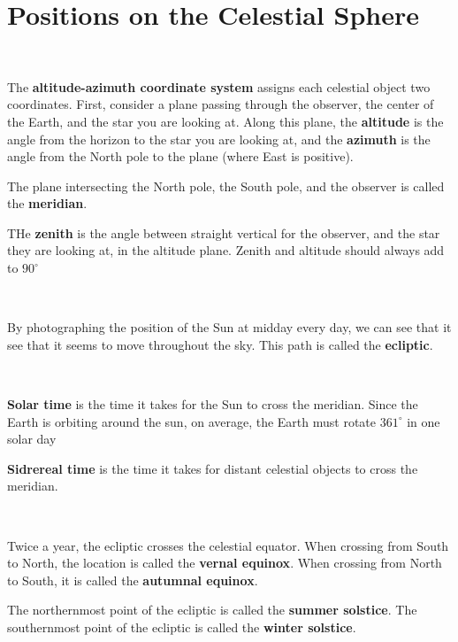 \documentclass{article}
\begin{document}
\section{Positions on the Celestial Sphere}

\begin{definition}
\

The \textbf{altitude-azimuth coordinate system} assigns each celestial object two coordinates. First, consider a plane passing through the observer, the center of the Earth, and the star you are looking at. Along this plane, the \textbf{altitude} is the angle from the horizon to the star you are looking at, and the \textbf{azimuth} is the angle from the North pole to the plane (where East is positive).

The plane intersecting the North pole, the South pole, and the observer is called the \textbf{meridian}. 

THe \textbf{zenith} is the angle between straight vertical for the observer, and the star they are looking at, in the altitude plane. Zenith and altitude should always add to $90^\circ$
\end{definition}

\begin{definition}[Ecliptic]
\

By photographing the position of the Sun at midday every day, we can see that it see that it seems to move throughout the sky. This path is called the \textbf{ecliptic}. 
\end{definition}

\begin{definition}[Time]
\

\textbf{Solar time} is the time it takes for the Sun to cross the meridian. Since the Earth is orbiting around the sun, on average, the Earth must rotate $361^\circ$ in one solar day

\textbf{Sidrereal time} is the time it takes for distant celestial objects to cross the meridian.
\end{definition}

\begin{definition}
\

Twice a year, the ecliptic crosses the celestial equator. When crossing from South to North, the location is called the \textbf{vernal equinox}. When crossing from North to South, it is called the \textbf{autumnal equinox}.  

The northernmost point of the ecliptic is called the \textbf{summer solstice}. The southernmost point of the ecliptic is called the \textbf{winter solstice}. 
\end{definition}
\end{document}
